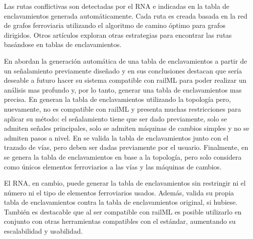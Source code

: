     Las rutas conflictivas son detectadas por el RNA e indicadas en la tabla de enclavamientos generada automáticamente. Cada ruta es creada basada en la red de grafos ferroviaria utilizando el algoritmo de camino óptimo para grafos dirigidos. Otros artículos \cite{Paper_114,Paper_162,Paper_170,Paper_182} exploran otras estrategias para encontrar las rutas basándose en tablas de enclavamientos. 
    
    En \cite{Paper_114} abordan la generación automática de una tabla de enclavamientos a partir de un señalamiento previamente diseñado y en sus conclusiones destacan que sería deseable a futuro hacer su sistema compatible con railML para poder realizar un análisis mas profundo y, por lo tanto, generar una tabla de enclavamientos mas precisa. En \cite{Paper_162} generan la tabla de enclavamientos utilizando la topología pero, nuevamente, no es compatible con railML y presenta muchas restricciones para aplicar su método: el señalamiento tiene que ser dado previamente, solo se admiten señales principales, solo se admiten máquinas de cambios simples y no se admiten pasos a nivel. En \cite{Paper_170} se valida la tabla de enclavamientos junto con el trazado de vías, pero deben ser dadas previamente por el usuario. Finalmente, en \cite{Paper_182} se genera la tabla de enclavamientos en base a la topología, pero solo considera como únicos elementos ferroviarios a las vías y las máquinas de cambios.
    
    El RNA, en cambio, puede generar la tabla de enclavamientos sin restringir ni el número ni el tipo de elementos ferroviarios usados. Además, valida su propia tabla de enclavamientos contra la tabla de enclavamientos original, si hubiese. También es destacable que al ser compatible con railML es posible utilizarlo en conjunto con otras herramientas compatibles con el estándar, aumentando su escalabilidad y usabilidad.
    
    
    
    
    
    
    
    
    
    
    
    
    
    
    
    
    
    
    
    
    
     